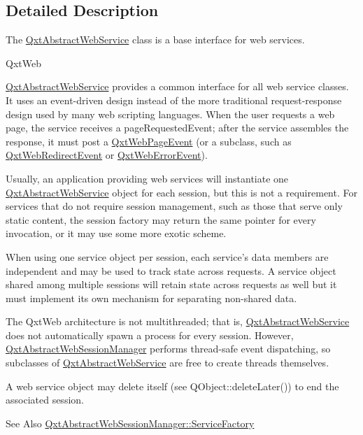 \subsection{Detailed Description}
The \hyperlink{class_qxt_abstract_web_service}{Qxt\-Abstract\-Web\-Service} class is a base interface for web services. 

Qxt\-Web

\hyperlink{class_qxt_abstract_web_service}{Qxt\-Abstract\-Web\-Service} provides a common interface for all web service classes. It uses an event-\/driven design instead of the more traditional request-\/response design used by many web scripting languages. When the user requests a web page, the service receives a page\-Requested\-Event; after the service assembles the response, it must post a \hyperlink{class_qxt_web_page_event}{Qxt\-Web\-Page\-Event} (or a subclass, such as \hyperlink{class_qxt_web_redirect_event}{Qxt\-Web\-Redirect\-Event} or \hyperlink{class_qxt_web_error_event}{Qxt\-Web\-Error\-Event}).

Usually, an application providing web services will instantiate one \hyperlink{class_qxt_abstract_web_service}{Qxt\-Abstract\-Web\-Service} object for each session, but this is not a requirement. For services that do not require session management, such as those that serve only static content, the session factory may return the same pointer for every invocation, or it may use some more exotic scheme.

When using one service object per session, each service's data members are independent and may be used to track state across requests. A service object shared among multiple sessions will retain state across requests as well but it must implement its own mechanism for separating non-\/shared data.

The Qxt\-Web architecture is not multithreaded; that is, \hyperlink{class_qxt_abstract_web_service}{Qxt\-Abstract\-Web\-Service} does not automatically spawn a process for every session. However, \hyperlink{class_qxt_abstract_web_session_manager}{Qxt\-Abstract\-Web\-Session\-Manager} performs thread-\/safe event dispatching, so subclasses of \hyperlink{class_qxt_abstract_web_service}{Qxt\-Abstract\-Web\-Service} are free to create threads themselves.

A web service object may delete itself (see Q\-Object\-::delete\-Later()) to end the associated session.

\begin{DoxySeeAlso}{See Also}
\hyperlink{class_qxt_abstract_web_session_manager_a7f507ee9b5b2c24ba2400258fa1a5f81}{Qxt\-Abstract\-Web\-Session\-Manager\-::\-Service\-Factory} 
\end{DoxySeeAlso}



